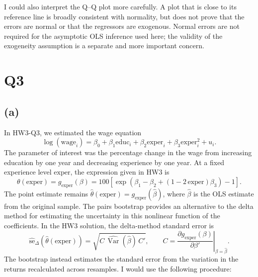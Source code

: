 \documentclass[11pt]{article}
\DeclareMathOperator{\Var}{Var}
\begin{document}
I could also interpret the Q--Q plot more carefully. A plot that is
close to its reference line is broadly consistent with normality,
but does not prove that the errors are normal or that the regressors
are exogenous. Normal errors are not required for the asymptotic OLS
inference used here; the validity of the exogeneity assumption is a
separate and more important concern.

\clearpage
\setcounter{section}{2}
\section{Q3}
\label{sec:q3}
\subsection{(a)}
In HW3-Q3, we estimated the wage equation
\[
\log(\text{wage}_i)
= \beta_0 + \beta_1\text{educ}_i + \beta_2\text{exper}_i
  + \beta_3\text{exper}_i^2 + u_i.
\]
The parameter of interest was the percentage change in the wage from
increasing education by one year and decreasing experience by one year.
At a fixed experience level $\text{exper}$, the expression given in HW3 is
\[
\theta(\text{exper})=g_{\text{exper}}(\beta)
=100\left[\exp\!\left(\beta_1-\beta_2+(1-2\,\text{exper})\beta_3\right)-1\right].
\]
The point estimate remains $\hat\theta(\text{exper})=g_{\text{exper}}(\hat\beta)$, where
$\hat\beta$ is the OLS estimate from the original sample. The pairs
bootstrap provides an alternative to the delta method for estimating
the uncertainty in this nonlinear function of the coefficients.
In the HW3 solution, the delta-method standard error is
\[
\widehat{\text{se}}_{\Delta}\!\left(\hat\theta(\text{exper})\right)
=\sqrt{C\,\widehat{\Var}(\hat\beta)\,C'},
\qquad
C=\left.\frac{\partial g_{\text{exper}}(\beta)}{\partial\beta'}
\right|_{\beta=\hat\beta}.
\]
The bootstrap instead estimates the standard error from the variation
in the returns recalculated across resamples. I would use the following procedure:
\end{document}
